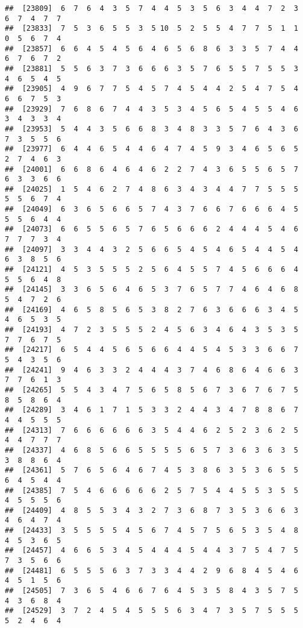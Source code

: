 \documentclass[
]{book}
\begin{document}
\begin{verbatim}
##  [23809]  6  7  6  4  3  5  7  4  4  5  3  5  6  3  4  4  7  2  3  6  7  4  7  7
##  [23833]  7  5  3  6  5  5  3  5 10  5  2  5  5  4  7  7  5  1  1  0  5  6  7  4
##  [23857]  6  6  4  5  4  5  6  4  6  5  6  8  6  3  3  5  7  4  4  6  7  6  7  2
##  [23881]  5  5  6  3  7  3  6  6  6  3  5  7  6  5  5  7  5  5  3  4  6  5  4  5
##  [23905]  4  9  6  7  7  5  4  5  7  4  5  4  4  2  5  4  7  5  4  6  6  7  5  3
##  [23929]  7  6  8  6  7  4  4  3  5  3  4  5  6  5  4  5  5  4  6  3  4  3  3  4
##  [23953]  5  4  4  3  5  6  6  8  3  4  8  3  3  5  7  6  4  3  6  7  3  5  5  6
##  [23977]  6  4  4  6  5  4  4  6  4  7  4  5  9  3  4  6  5  6  5  2  7  4  6  3
##  [24001]  6  6  8  6  4  6  4  6  2  2  7  4  3  6  5  5  6  5  7  6  3  3  6  6
##  [24025]  1  5  4  6  2  7  4  8  6  3  4  3  4  4  7  7  5  5  5  5  5  6  7  4
##  [24049]  6  3  6  5  6  6  5  7  4  3  7  6  6  7  6  6  6  4  5  5  5  6  4  4
##  [24073]  6  6  5  5  6  5  7  6  5  6  6  6  2  4  4  4  5  4  6  7  7  7  3  4
##  [24097]  3  3  4  4  3  2  5  6  6  5  4  5  4  6  5  4  4  5  4  6  3  8  5  6
##  [24121]  4  5  3  5  5  5  2  5  6  4  5  5  7  4  5  6  6  6  4  5  5  6  4  8
##  [24145]  3  3  6  5  6  4  6  5  3  7  6  5  7  7  4  6  4  6  8  5  4  7  2  6
##  [24169]  4  6  5  8  5  6  5  3  8  2  7  6  3  6  6  6  3  4  5  4  6  5  3  5
##  [24193]  4  7  2  3  5  5  5  2  4  5  6  3  4  6  4  3  5  3  5  7  7  6  7  5
##  [24217]  6  5  4  4  5  6  5  6  6  4  4  5  4  5  3  3  6  6  7  5  4  3  5  6
##  [24241]  9  4  6  3  3  2  4  4  4  3  7  4  6  8  6  4  6  6  3  7  7  6  1  3
##  [24265]  5  5  4  3  4  7  5  6  5  8  5  6  7  3  6  7  6  7  5  8  5  8  6  4
##  [24289]  3  4  6  1  7  1  5  3  3  2  4  4  3  4  7  8  8  6  7  4  4  5  5  5
##  [24313]  7  6  6  6  6  6  6  3  5  4  4  6  2  5  2  3  6  2  5  4  4  7  7  7
##  [24337]  4  6  8  5  6  6  5  5  5  5  6  5  7  3  6  3  6  3  5  3  8  8  6  4
##  [24361]  5  7  6  5  6  4  6  7  4  5  3  8  6  3  5  3  6  5  5  6  4  5  4  4
##  [24385]  7  5  4  6  6  6  6  6  2  5  7  5  4  4  5  5  3  5  5  4  5  5  5  6
##  [24409]  4  8  5  5  3  4  3  2  7  3  6  8  7  3  5  3  6  6  3  4  6  4  7  4
##  [24433]  3  5  5  5  5  4  5  6  7  4  5  7  5  6  5  3  5  4  8  4  5  3  6  5
##  [24457]  4  6  6  5  3  4  5  4  4  4  5  4  4  3  7  5  4  7  5  7  3  5  6  6
##  [24481]  6  5  5  5  6  3  7  3  3  4  4  2  9  6  8  4  5  4  6  4  5  1  5  6
##  [24505]  7  3  6  5  4  6  6  7  6  4  5  3  5  8  4  3  5  7  5  4  3  6  8  4
##  [24529]  3  7  2  4  5  4  5  5  5  6  3  4  7  3  5  7  5  5  5  5  2  4  6  4

\end{verbatim}
\end{document}
